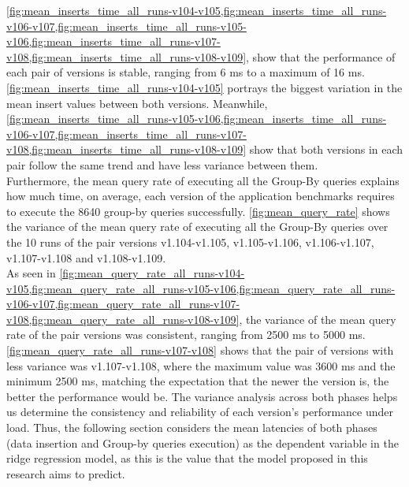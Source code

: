 \cref{fig:mean_inserts_time_all_runs-v104-v105,fig:mean_inserts_time_all_runs-v106-v107,fig:mean_inserts_time_all_runs-v105-v106,fig:mean_inserts_time_all_runs-v107-v108,fig:mean_inserts_time_all_runs-v108-v109}, show that the performance of each pair of versions is stable, ranging from 6 \ac{ms} to a maximum of 16 \ac{ms}. \cref{fig:mean_inserts_time_all_runs-v104-v105} portrays the biggest variation in the mean insert values between both versions. Meanwhile, \cref{fig:mean_inserts_time_all_runs-v105-v106,fig:mean_inserts_time_all_runs-v106-v107,fig:mean_inserts_time_all_runs-v107-v108,fig:mean_inserts_time_all_runs-v108-v109} show that both versions in each pair follow the same trend and have less variance between them.\\
Furthermore, the mean query rate of executing all the Group-By queries explains how much time, on average, each version of the application benchmarks requires to execute the 8640 group-by queries successfully.  \cref{fig:mean_query_rate} shows the variance of the mean query rate of executing all the Group-By queries over the 10 runs of the pair versions v1.104-v1.105, v1.105-v1.106, v1.106-v1.107, v1.107-v1.108 and v1.108-v1.109.  \\
As seen in  \cref{fig:mean_query_rate_all_runs-v104-v105,fig:mean_query_rate_all_runs-v105-v106,fig:mean_query_rate_all_runs-v106-v107,fig:mean_query_rate_all_runs-v107-v108,fig:mean_query_rate_all_runs-v108-v109},  the variance of the mean query rate of the pair versions was consistent, ranging from 2500 \ac{ms} to 5000 \ac{ms}. \cref{fig:mean_query_rate_all_runs-v107-v108} shows that the pair of versions with less variance was v1.107-v1.108, where the maximum value was 3600 \ac{ms} and the minimum 2500 \ac{ms}, matching the expectation that the newer the version is, the better the performance would be. The variance analysis across both phases helps us determine the consistency and reliability of each version's performance under load. Thus, the following section considers the mean latencies of both phases (data insertion and Group-by queries execution) as the dependent variable in the ridge regression model, as this is the value that the model proposed in this research aims to predict. 

